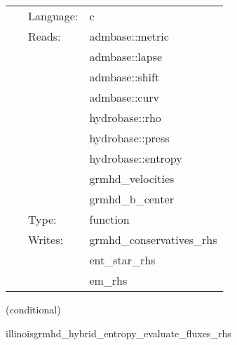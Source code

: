 \documentclass{article}
\begin{document}
 \begin{tabular*}{160mm}{cll} 
~ & Language:  & c \\ 
~ & Reads:  & admbase::metric \\ 
~& ~ &admbase::lapse\\ 
~& ~ &admbase::shift\\ 
~& ~ &admbase::curv\\ 
~& ~ &hydrobase::rho\\ 
~& ~ &hydrobase::press\\ 
~& ~ &hydrobase::entropy\\ 
~& ~ &grmhd\_velocities\\ 
~& ~ &grmhd\_b\_center\\ 
~ & Type:  & function \\ 
~ & Writes:  & grmhd\_conservatives\_rhs \\ 
~& ~ &ent\_star\_rhs\\ 
~& ~ &em\_rhs\\ 
\end{tabular*} 


\vspace{5mm}

   (conditional) 

\hspace{5mm} illinoisgrmhd\_hybrid\_entropy\_evaluate\_fluxes\_rhs 

\hspace{5mm}{\it entropy+hybrid version of illinoisgrmhd\_evaluate\_fluxes\_rhs } 


\hspace{5mm}
\end{document}
